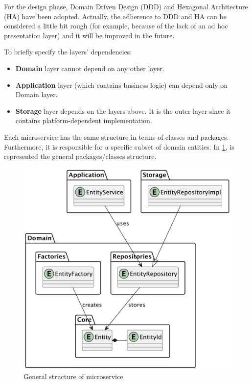 \documentclass{scrartcl}
\begin{document}
    For the design phase, Domain Driven Design (DDD) and Hexagonal Architecture (HA) have been adopted.
    Actually, the adherence to DDD and HA can be considered a little bit rough (for example, because of the lack of an ad hoc presentation layer) and it will be improved in the future.

    To briefly specify the layers' dependencies:
    \begin{itemize}
        \item \textbf{Domain} layer cannot depend on any other layer.
        \item \textbf{Application} layer (which contains business logic) can depend only on Domain layer.
        \item \textbf{Storage} layer depends on the layers above.
        It is the outer layer since it contains platform-dependent implementation.
    \end{itemize}


    Each microservice has the same structure in terms of classes and packages.
    Furthermore, it is responsible for a specific subset of domain entities.
    In \cref{fig:general-structure}, is represented the general packages/classes structure.

    \begin{figure}
        \centering
        \includegraphics[scale=0.55]{img/general-structure}
        \caption{General structure of microservice}
        \label{fig:general-structure}
    \end{figure}
\end{document}
